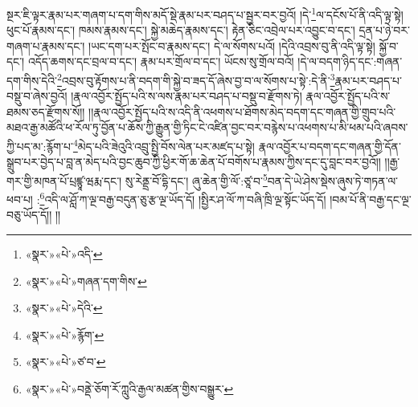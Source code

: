 སྔར་ཇི་ལྟར་རྣམ་པར་གཞག་པ་དག་གིས་མདོ་སྡེ་རྣམ་པར་བཤད་པ་སྦྱར་བར་བྱའོ། །དེ་\footnote{«སྣར་»«པེ་»འདི་}ལ་དངོས་པོ་ནི་འདི་ལྟ་སྟེ། ཕུང་པོ་རྣམས་དང་། ཁམས་རྣམས་དང་། སྐྱེ་མཆེད་རྣམས་དང་། རྟེན་ཅིང་འབྲེལ་པར་འབྱུང་བ་དང་། དྲན་པ་ཉེ་བར་གཞག་པ་རྣམས་དང་། །ཡང་དག་པར་སྤོང་བ་རྣམས་དང་། དེ་ལ་སོགས་པའོ། །དེའི་འབྲས་བུ་ནི་འདི་ལྟ་སྟེ། སྐྱོ་བ་དང་། འདོད་ཆགས་དང་བྲལ་བ་དང་། རྣམ་པར་གྲོལ་བ་དང་། ཡོངས་སུ་གྲོལ་བའོ། །དེ་ལ་བདག་ཉིད་དང་:གཞན་དག་གིས་དེའི་\footnote{«སྣར་»«པེ་»གཞན་དག་གིས་}འབྲས་བུ་རྟོགས་པ་ནི་བདག་གི་སྐྱེ་བ་ཟད་དོ་ཞེས་བྱ་བ་ལ་སོགས་པ་སྟེ་:དེ་ནི་\footnote{«སྣར་»«པེ་»དེའི་}རྣམ་པར་བཤད་པ་བསྡུ་བ་ཞེས་བྱའོ། །རྣལ་འབྱོར་སྤྱོད་པའི་ས་ལས་རྣམ་པར་བཤད་པ་བསྡུ་བ་རྫོགས་ཏེ། རྣལ་འབྱོར་སྤྱོད་པའི་ས་ཐམས་ཅད་རྫོགས་སོ།། །།རྣལ་འབྱོར་སྤྱོད་པའི་ས་འདི་ནི་འཕགས་པ་ཐོགས་མེད་བདག་དང་གཞན་གྱི་གྲུབ་པའི་མཐའ་རྒྱ་མཚོའི་ཕ་རོལ་ཏུ་བྱོན་པ་ཆོས་ཀྱི་རྒྱུན་གྱི་ཏིང་ངེ་འཛིན་བྱང་བར་བརྙེས་པ་འཕགས་པ་མི་ཕམ་པའི་ཞབས་ཀྱི་པད་མ་:རྙོག་པ་\footnote{«སྣར་»«པེ་»རྙོག་}མེད་པའི་ཟེའུའི་འབྲུ་སྤྱི་བོས་ལེན་པར་མཛད་པ་སྟེ། རྣལ་འབྱོར་པ་བདག་དང་གཞན་གྱི་དོན་སྒྲུབ་པར་བྱེད་པ་བླ་ན་མེད་པའི་བྱང་ཆུབ་ཀྱི་ཕྱིར་གོ་ཆ་ཆེན་པོ་བགོས་པ་རྣམས་ཀྱིས་དང་དུ་བླང་བར་བྱའོ།། །།རྒྱ་གར་གྱི་མཁན་པོ་པྲཛྙཱ་ཝརྨ་དང་། སུ་རེནྡྲ་བོ་དྷི་དང་། ཞུ་ཆེན་གྱི་ལོ་:ཙཱ་བ་\footnote{«སྣར་»«པེ་»ཙ་བ་}བན་དེ་ཡེ་ཤེས་སྡེས་ཞུས་ཏེ་གཏན་ལ་ཕབ་པ། :\footnote{«སྣར་»«པེ་»བནྡེ་ཅོག་རོ་ཀླུའི་རྒྱལ་མཚན་གྱིས་བསྒྱུར་}འདི་ལ་ཤློ་ཀ་ལྔ་བརྒྱ་བདུན་ཅུ་རྩ་ལྔ་ཡོད་དོ། །སྤྱིར་ཤ་ལོ་ཀ་བཞི་ཁྲི་ལྔ་སྟོང་ཡོད་དོ། །བམ་པོ་ནི་བརྒྱ་དང་ལྔ་བཅུ་ཡོད་དོ།། །།